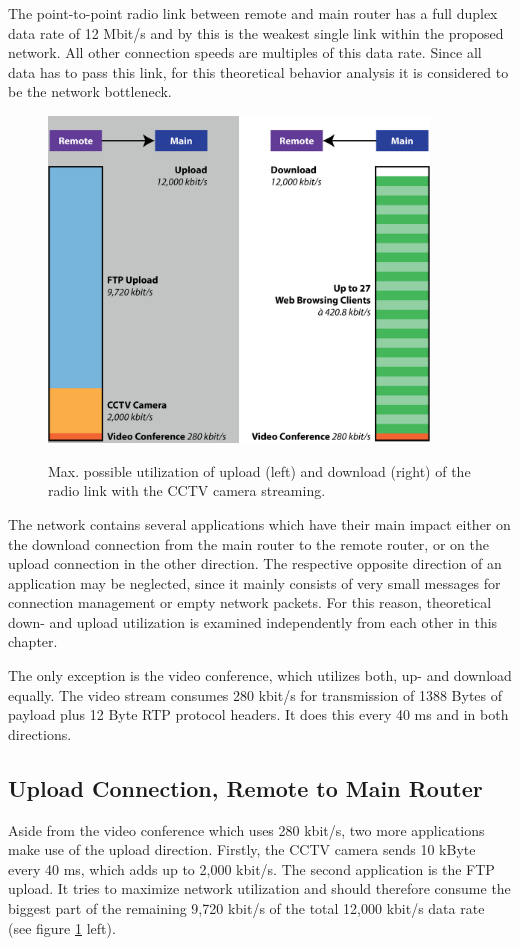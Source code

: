 \documentclass[a4paper,10pt]{book}\usepackage{graphicx}
\begin{document}
The point-to-point radio link between remote and main router has a full duplex data rate of 12 Mbit/s and by this is the weakest single link within the proposed network. All other connection speeds are multiples of this data rate. Since all data has to pass this link, for this theoretical behavior analysis it is considered to be the network bottleneck.
\begin{figure}[!ht]
  \centering
    \includegraphics[width=0.9\textwidth]{graphics-01.eps}
    \label{fig:radio_link_theory_on}
    \caption{Max. possible utilization of upload (left) and download (right) of the radio link with the CCTV camera streaming.}
\end{figure}

The network contains several applications which have their main impact either on the download connection from the main router to the remote router, or on the upload connection in the other direction. The respective opposite direction of an application may be neglected, since it mainly consists of very small messages for connection management or empty network packets. For this reason, theoretical down- and upload utilization is examined independently from each other in this chapter. 

The only exception is the video conference, which utilizes both, up- and download equally. The video stream consumes 280 kbit/s for transmission of 1388 Bytes of payload plus 12 Byte RTP protocol headers. It does this every 40 ms and in both directions.

\subsection{Upload Connection, Remote to Main Router}
Aside from the video conference which uses 280 kbit/s, two more applications make use of the upload direction. Firstly, the CCTV camera sends 10 kByte every 40 ms, which adds up to 2,000 kbit/s. The second application is the FTP upload. It tries to maximize network utilization and should therefore consume the biggest part of the remaining 9,720 kbit/s of the total 12,000 kbit/s data rate (see figure \ref{fig:radio_link_theory_on} left).
\end{document}
